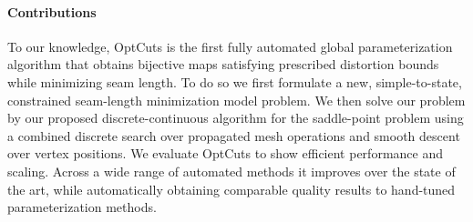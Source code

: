 \paragraph{Contributions}

To our knowledge, OptCuts is the first fully automated global parameterization algorithm that obtains bijective maps satisfying prescribed distortion bounds while minimizing seam length. To do so we first formulate a new, simple-to-state, constrained seam-length minimization model problem. We then solve our problem by our proposed discrete-continuous algorithm for the saddle-point problem using a combined discrete search over propagated mesh operations and smooth descent over vertex positions. We evaluate OptCuts to show efficient performance and scaling. Across a wide range of automated methods it improves over the state of the art, while automatically obtaining comparable quality results to hand-tuned parameterization methods. 
